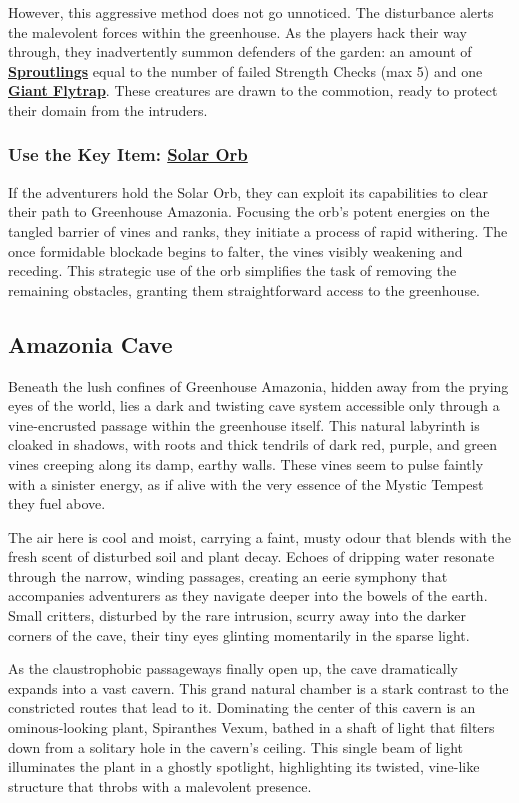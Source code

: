 However, this aggressive method does not go unnoticed. The disturbance alerts the malevolent forces within the greenhouse. As the players hack their way through, they inadvertently summon defenders of the garden: an amount of \hyperref[sec:Sproutling]{\textbf{Sproutlings}} equal to the number of failed Strength Checks (max 5) and one \hyperref[sec:GiantFlytrap]{\textbf{Giant Flytrap}}. These creatures are drawn to the commotion, ready to protect their domain from the intruders.

\subsubsection*{Use the Key Item: \hyperref[sec:SolarOrb]{Solar Orb}}
If the adventurers hold the Solar Orb, they can exploit its capabilities to clear their path to Greenhouse Amazonia. Focusing the orb's potent energies on the tangled barrier of vines and ranks, they initiate a process of rapid withering. The once formidable blockade begins to falter, the vines visibly weakening and receding. This strategic use of the orb simplifies the task of removing the remaining obstacles, granting them straightforward access to the greenhouse.

\subsection*{Amazonia Cave}
Beneath the lush confines of Greenhouse Amazonia, hidden away from the prying eyes of the world, lies a dark and twisting cave system accessible only through a vine-encrusted passage within the greenhouse itself. This natural labyrinth is cloaked in shadows, with roots and thick tendrils of dark red, purple, and green vines creeping along its damp, earthy walls. These vines seem to pulse faintly with a sinister energy, as if alive with the very essence of the Mystic Tempest they fuel above.

The air here is cool and moist, carrying a faint, musty odour that blends with the fresh scent of disturbed soil and plant decay. Echoes of dripping water resonate through the narrow, winding passages, creating an eerie symphony that accompanies adventurers as they navigate deeper into the bowels of the earth. Small critters, disturbed by the rare intrusion, scurry away into the darker corners of the cave, their tiny eyes glinting momentarily in the sparse light.

As the claustrophobic passageways finally open up, the cave dramatically expands into a vast cavern. This grand natural chamber is a stark contrast to the constricted routes that lead to it. Dominating the center of this cavern is an ominous-looking plant, Spiranthes Vexum, bathed in a shaft of light that filters down from a solitary hole in the cavern's ceiling. This single beam of light illuminates the plant in a ghostly spotlight, highlighting its twisted, vine-like structure that throbs with a malevolent presence.

